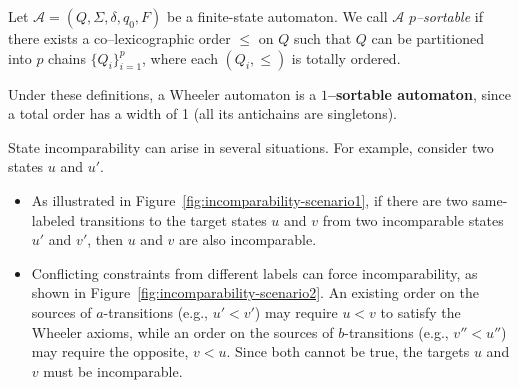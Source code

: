 \begin{definition} \label{def:p-sorable-automaton}
    Let $\mathcal{A} = (Q, \Sigma, \delta, q_0, F)$ be a finite-state automaton. We call $\mathcal{A}$ \emph{$p$--sortable} if there exists a co--lexicographic order $\leq$ on $Q$ such that $Q$ can be partitioned into $p$ chains $\{Q_i\}_{i=1}^p$, where each $(Q_i, \leq)$ is totally ordered.
\end{definition}

Under these definitions, a Wheeler automaton is a \textbf{$1$--sortable automaton}, since a total order has a width of 1 (all its antichains are singletons).

\begin{example} \label{ex:incomparability}
    State incomparability can arise in several situations. For example, consider two states $u$ and $u'$.
    \begin{itemize}
        \item As illustrated in Figure~\ref{fig:incomparability-scenario1}, if there are two same-labeled transitions to the target states $u$ and $v$ from two incomparable states $u'$ and $v'$, then $u$ and $v$ are also incomparable.
        \item Conflicting constraints from different labels can force incomparability, as shown in Figure~\ref{fig:incomparability-scenario2}. An existing order on the sources of $a$-transitions (e.g., $u' < v'$) may require $u < v$ to satisfy the Wheeler axioms, while an order on the sources of $b$-transitions (e.g., $v'' < u''$) may require the opposite, $v < u$. Since both cannot be true, the targets $u$ and $v$ must be incomparable.
    \end{itemize}

    \begin{figure}[H]
    \centering
    \begin{subfigure}[b]{0.4\textwidth}
        \centering
\end{subfigure}
\end{figure}
\end{example}
